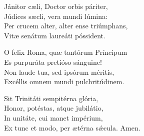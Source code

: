 Jánitor cæli, Doctor orbis páriter,\\
Júdices sæcli, vera mundi lúmina:\\
Per crucem alter, alter ense triúmphans,\\
Vitæ senátum laureáti póssident.

O felix Roma, quæ tantórum Príncipum\\
Es purpuráta pretióso sánguine!\\
Non laude tua, sed i\-psórum méritis,\\
Excéllis o\-mnem mundi pulchritúdinem.

Sit Trinitáti sempitérna glória,\\
Honor, potéstas, atque jubilátio,\\
In unitáte, cui manet impérium,\\
Ex tunc et modo, per ætérna sǽcula. Amen.